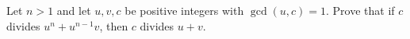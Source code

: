Let $n>1$ and let $u,v,c$ be positive integers with $\gcd(u,c)=1$. Prove that if $c$ divides $u^n+u^{n-1}v$, then $c$ divides $u+v$.
